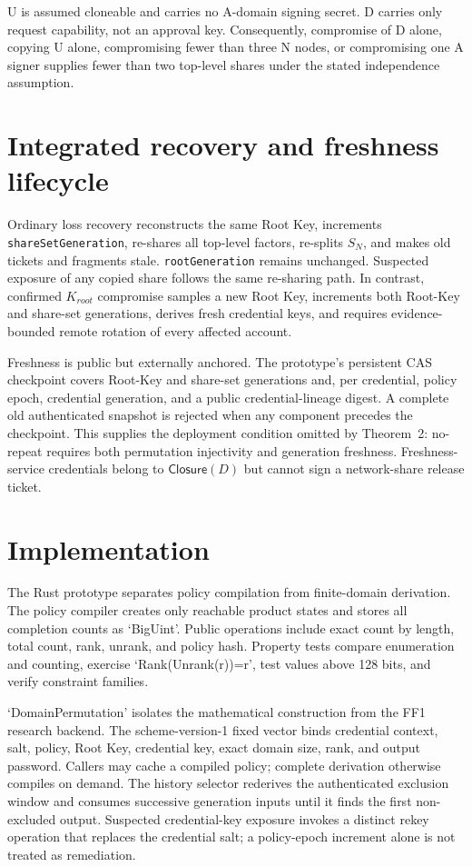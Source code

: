 \documentclass[preprint,12pt]{elsarticle}
\begin{document}
U is assumed cloneable and carries no A-domain signing secret. D carries only
request capability, not an approval key. Consequently, compromise of D alone,
copying U alone, compromising fewer than three N nodes, or compromising one A
signer supplies fewer than two top-level shares under the stated independence
assumption.

\section{Integrated recovery and freshness lifecycle}

Ordinary loss recovery reconstructs the same Root Key, increments
\texttt{shareSetGeneration}, re-shares all top-level factors, re-splits $S_N$,
and makes old tickets and fragments stale. \texttt{rootGeneration} remains
unchanged. Suspected exposure of any copied share follows the same re-sharing
path. In contrast, confirmed $K_{root}$ compromise samples a new Root Key,
increments both Root-Key and share-set generations, derives fresh credential
keys, and requires evidence-bounded remote rotation of every affected account.

Freshness is public but externally anchored. The prototype's persistent CAS
checkpoint covers Root-Key and share-set generations and, per credential,
policy epoch, credential generation, and a public credential-lineage digest.
A complete old authenticated snapshot is rejected when any component precedes
the checkpoint. This supplies the deployment condition omitted by Theorem~2:
no-repeat requires both permutation injectivity and generation freshness.
Freshness-service credentials belong to $\mathsf{Closure}(D)$ but cannot sign a
network-share release ticket.

\section{Implementation}

The Rust prototype separates policy compilation from finite-domain derivation. The
policy compiler creates only reachable product states and stores all completion
counts as `BigUint'. Public operations include exact count by length, total
count, rank, unrank, and policy hash. Property tests compare enumeration and
counting, exercise `Rank(Unrank(r))=r', test values above 128 bits, and verify
constraint families.

`DomainPermutation' isolates the mathematical construction from the FF1
research backend. The scheme-version-1 fixed vector binds credential context,
salt, policy, Root Key, credential key, exact domain size, rank, and output
password. Callers may cache a compiled policy; complete derivation otherwise
compiles on demand. The history selector rederives the authenticated exclusion
window and consumes successive generation inputs until it finds the first
non-excluded output. Suspected credential-key exposure invokes a distinct
rekey operation that replaces the credential salt; a policy-epoch increment
alone is not treated as remediation.
\end{document}
